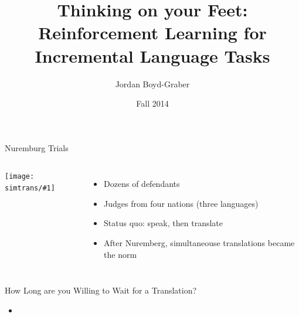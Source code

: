 \documentclass[compress]{beamer}
\title[Thinking on Your Feet]{Thinking on your Feet: Reinforcement Learning for Incremental
Language Tasks}
\author{ Jordan Boyd-Graber}
\date{Fall 2014}
\institute[Boulder] %
{University of Colorado Boulder}
\newcommand{\gfxs}[2]{
\begin{center}
	\texttt{[image: simtrans/\#1]}
\end{center}
}
\begin{document}
\frame{
\titlepage
\tiny
}


\begin{frame}{Nuremburg Trials}

\begin{columns}


    \gfxs{nuremberg_trials}{1.0}


    \begin{itemize}
        \item Dozens of defendants
        \item Judges from four nations (three languages)
\pause
        \item Status quo: speak, then translate
\pause
        \item After Nuremberg, simultaneouse translations became the norm
     \end{itemize}

\end{columns}

\end{frame}


\begin{frame}{How Long are you Willing to Wait for a Translation?}

\begin{itemize}
  \item {}



\end{itemize}

\end{frame}
\end{document}
